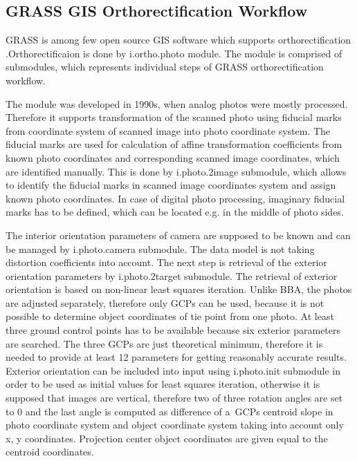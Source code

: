 \documentclass[a4paper,12pt]{article}
\begin{document}
\subsection{GRASS GIS Orthorectification Workflow}

GRASS is among few open source GIS software which supports orthorectification
\cite{rocchini2012robust}.Orthorectificaion is done 
by i.ortho.photo \cite{i.ortho.photo} module.
The module is comprised of submodules, which represents individual steps of 
GRASS orthorectification workflow.


The module was developed in 1990s,  
when analog photos were mostly processed. Therefore it supports 
 transformation of the scanned photo using fiducial marks from coordinate system of scanned image into 
 photo coordinate system. The fiducial marks are used for calculation of 
 affine transformation coefficients from known photo coordinates 
 and corresponding scanned image coordinates, which are identified manually. 
 This is done by i.photo.2image submodule, which allows to identify the fiducial 
 marks in scanned image coordinates system and assign known photo coordinates.
  In case of digital photo processing, imaginary fiducial marks has to be defined, which
can be located e.g. in the middle of photo sides.  
  

The interior orientation parameters of camera are supposed to be known and can 
be managed by i.photo.camera submodule.
The data model is not taking distortion 
coefficients into account. 
The next step is retrieval of the exterior orientation parameters by i.photo.2target submodule.  
The retrieval 
of exterior orientation is based on non-linear least squares iteration. Unlike BBA,
the photos are adjusted separately, therefore only GCPs can be used,
because it is not possible to determine object coordinates of tie point from one photo.
At least three ground control points has to be available because six exterior parameters are 
searched. The three GCPs are just theoretical minimum, therefore it is needed to provide at least 12 parameters
for getting reasonably accurate results. Exterior orientation 
can be included into input using i.photo.init submodule in order to be used as initial values for least squares iteration,
otherwise it is supposed that images are vertical, therefore two of three rotation
angles are set to 0 and the last angle is computed as difference of a~GCPs centroid  slope
in photo coordinate system and object coordinate system taking into account only x, y coordinates.
Projection center object coordinates are given equal to the centroid coordinates.
\end{document}
